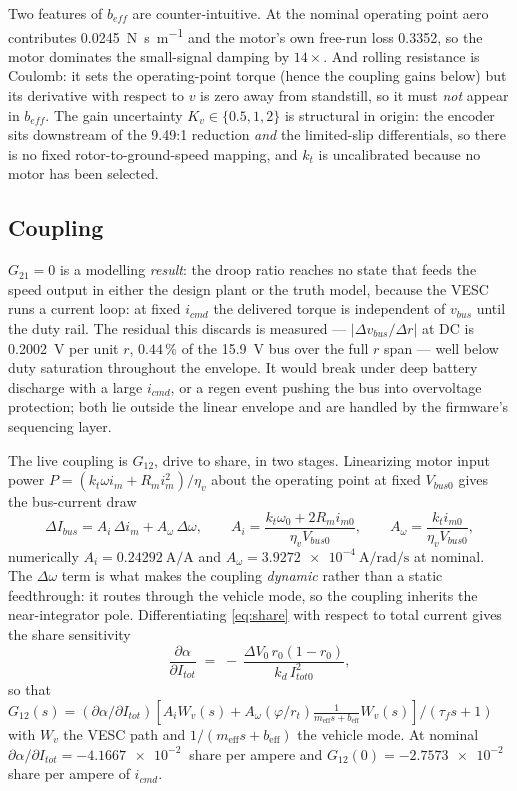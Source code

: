 \documentclass[energies,article,submit,pdftex,oneauthor]{Definitions/mdpi}
\begin{document}
Two features of $b_{\!e\!f\!f}$ are counter-intuitive. At the nominal operating point aero
contributes \SI{0.0245}{\newton\second\per\meter} and the motor's own free-run loss
\SI{0.3352}{}, so the motor dominates the small-signal damping by $14\times$. And rolling
resistance is Coulomb: it sets the operating-point torque (hence the coupling gains below) but
its derivative with respect to $v$ is zero away from standstill, so it must \emph{not} appear in
$b_{\!e\!f\!f}$. The gain uncertainty $K_v\in\{0.5,1,2\}$ is structural in origin: the
encoder sits downstream of the \num{9.49}:1 reduction \emph{and} the limited-slip differentials,
so there is no fixed rotor-to-ground-speed mapping, and $k_t$ is uncalibrated because no motor
has been selected.

\subsection{Coupling}

$G_{21}=0$ is a modelling \emph{result}: the droop ratio reaches no state that
feeds the speed output in either the design plant or the truth model, because the VESC runs a
current loop: at fixed $i_{cmd}$ the delivered torque is independent of $v_{bus}$ until the duty
rail. The residual this discards is measured --- $|\Delta v_{bus}/\Delta r|$ at DC is
\SI{0.2002}{\volt} per unit $r$, $0.44\,\%$ of the \SI{15.9}{\volt} bus over the full $r$ span
--- well below duty saturation throughout the envelope. It would break under deep battery
discharge with a large $i_{cmd}$, or a regen event pushing the bus into overvoltage protection;
both lie outside the linear envelope and are handled by the firmware's sequencing layer.

The live coupling is $G_{12}$, drive to share, in two stages. Linearizing motor input power
$P = (k_t\omega i_m + R_m i_m^2)/\eta_v$ about the operating point at fixed $V_{bus0}$ gives the
bus-current draw
\begin{equation}\label{eq:Ibus}
\Delta I_{bus} = A_i\,\Delta i_m + A_\omega\,\Delta\omega, \qquad
A_i = \frac{k_t\omega_0 + 2R_m i_{m0}}{\eta_v V_{bus0}}, \qquad
A_\omega = \frac{k_t i_{m0}}{\eta_v V_{bus0}} ,
\end{equation}
numerically $A_i = \SI{0.24292}{\ampere\per\ampere}$ and
$A_\omega = \SI{3.9272e-4}{\ampere\per\radian\per\second}$ at nominal. The $\Delta\omega$ term is
what makes the coupling \emph{dynamic} rather than a static feedthrough: it routes through the
vehicle mode, so the coupling inherits the near-integrator pole. Differentiating
\eqref{eq:share} with respect to total current gives the share sensitivity
\begin{equation}\label{eq:dalpha}
\frac{\partial\alpha}{\partial I_{tot}} \;=\; -\,\frac{\Delta V_0\, r_0(1-r_0)}{k_d\, I_{tot0}^2},
\end{equation}
so that $G_{12}(s) = (\partial\alpha/\partial I_{tot})\left[A_i W_v(s) + A_\omega(\varphi/r_t)
\frac{1}{m_{\mathrm{eff}}s+b_{\mathrm{eff}}} W_v(s)\right]/(\tau_f s + 1)$ with $W_v$ the VESC
path and $1/(m_{\mathrm{eff}}s+b_{\mathrm{eff}})$ the vehicle mode. At nominal
$\partial\alpha/\partial I_{tot} = \SI{-4.1667e-2}{}$ share per ampere and
$G_{12}(0) = \SI{-2.7573e-2}{}$ share per ampere of $i_{cmd}$.
\end{document}
